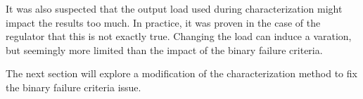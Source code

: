It was also suspected that the output load used during characterization might impact the results too much.
In practice, it was proven in the case of the regulator that this is not exactly true.
Changing the load can induce a varation, but seemingly more limited than the impact of the binary failure criteria.


The next section will explore a modification of the characterization method to fix the binary failure criteria issue.
